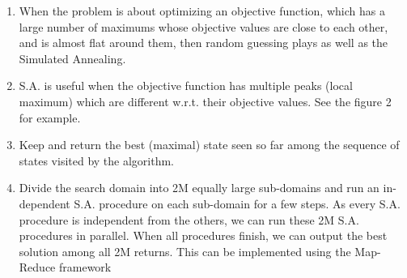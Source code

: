 \documentclass[12pt]{article}
\begin{document}
\begin{enumerate}
\begin{enumerate}
    \item When the problem is about optimizing an objective function, which has a large number of maximums whose objective values are close to each other, and is almost flat around them, then random guessing plays as well as the Simulated Annealing.
    
    \item S.A. is useful when the objective function has multiple peaks (local maximum) which are different w.r.t. their objective values. See the figure 2 for example.
    
    \item Keep and return the best (maximal) state seen so far among the sequence of states visited by the algorithm.
    
    \item Divide the search domain into 2M equally large sub-domains and run an in- dependent S.A. procedure on each sub-domain for a few steps. As every S.A. procedure is independent from the others, we can run these 2M S.A. procedures in parallel. When all procedures finish, we can output the best solution among all 2M returns. This can be implemented using the Map-Reduce framework


\end{enumerate}

\end{enumerate}
\end{document}
